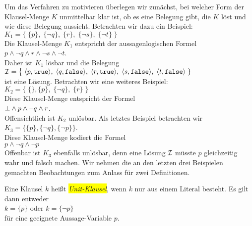 Um das Verfahren zu motivieren \"{u}berlegen wir zun\"{a}chst, bei welcher Form der Klausel-Menge $K$
unmittelbar klar ist, ob es eine Belegung gibt, die $K$ l\"{o}st und wie diese Belegung
aussieht.  Betrachten wir dazu ein Beispiel: \\[0.2cm]
\hspace*{1.3cm} 
$K_1 = \bigl\{\; \{p\},\; \{\neg q\},\; \{r\},\; \{\neg s\}, \; \{\neg t\} \;\bigr\}$ 
\\[0.2cm]
Die Klausel-Menge $K_1$ entspricht der aussagenlogischen Formel
\\[0.2cm]
\hspace*{1.3cm}
$p \wedge \neg q \wedge r \wedge \neg s \wedge \neg t$.
\\[0.2cm]
Daher ist $K_1$ l\"{o}sbar und die Belegung  \\[0.2cm]
\hspace*{1.3cm} 
$\I = \bigl\{\; \pair(p, \mathtt{true}),\; \pair(q, \mathtt{false}),\;\pair(r, \mathtt{true}),\; \pair(s, \mathtt{false}),\; \pair(t, \mathtt{false})\;\}$
\\[0.2cm]
ist eine L\"{o}sung.  Betrachten wir eine weiteres Beispiel: \\[0.2cm]
\hspace*{1.3cm} 
$K_2 = \bigl\{\; \{\}, \{p\},\; \{\neg q\},\; \{r\}\; \bigr\}$ 
\\[0.2cm]
Diese Klausel-Menge entspricht der Formel
\\[0.2cm]
\hspace*{1.3cm}
$\bot \wedge p \wedge \neg q \wedge r$.
\\[0.2cm]
Offensichtlich ist $K_2$ unl\"{o}sbar.  Als letztes Beispiel betrachten wir 
\\[0.2cm]
\hspace*{1.3cm} $K_3 = \bigl\{ \{p\}, \{\neg q\}, \{\neg p\} \bigr\}$.
\\[0.2cm]
Diese Klausel-Menge kodiert die Formel
\\[0.2cm]
\hspace*{1.3cm}
$p \wedge \neg q \wedge \neg p $
\\[0.2cm]
Offenbar ist $K_3$ ebenfalls unl\"{o}sbar, denn eine L\"{o}sung $\mathcal{I}$ m\"{u}sste $p$ gleichzeitig
wahr und falsch machen.
Wir nehmen die an den letzten drei Beispielen gemachten Beobachtungen zum Anlass f\"{u}r zwei Definitionen.

\begin{Definition}
  Eine Klausel $k$ hei\ss{}t \colorbox{yellow}{\emph{Unit-Klausel}}, wenn $k$ nur aus einem Literal besteht.
  Es gilt dann entweder
  \\[0.2cm]
  \hspace*{1.3cm}
  $k = \{p\}$ \quad oder \quad $k = \{\neg p\}$ 
  \\[0.2cm]
  f\"{u}r eine geeignete Aussage-Variable $p$. \eox
\end{Definition}

